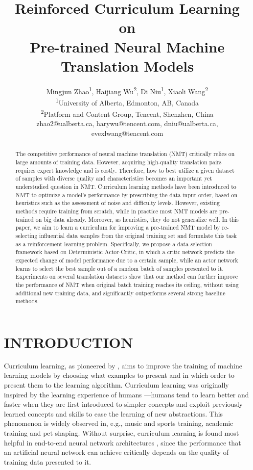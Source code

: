 \documentclass[letterpaper]{article}
\title{Reinforced Curriculum Learning on\\ Pre-trained Neural Machine Translation Models}
\author{Mingjun Zhao\textsuperscript{\rm 1}, Haijiang Wu\textsuperscript{\rm 2}, Di Niu\textsuperscript{\rm 1}, Xiaoli Wang\textsuperscript{\rm 2}\\ %
\textsuperscript{\rm 1}University of Alberta, Edmonton, AB, Canada\\
\textsuperscript{\rm 2}Platform and Content Group, Tencent, Shenzhen, China\\
zhao2@ualberta.ca, harywu@tencent.com, dniu@ualberta.ca, evexlwang@tencent.com
}%
\begin{document}
\maketitle

\begin{abstract}
The competitive performance of neural machine translation (NMT) critically relies on large amounts of training data. However, acquiring high-quality translation pairs requires expert knowledge and is costly. Therefore, how to best utilize a given dataset of samples with diverse quality and characteristics becomes an important yet understudied question in NMT. Curriculum learning methods have been introduced to NMT to optimize a model's performance by prescribing the data input order, based on heuristics such as the assessment of noise and difficulty levels. However, existing methods require training from scratch, while in practice most NMT models are pre-trained on big data already. Moreover, as heuristics, they do not generalize well. In this paper, we aim to learn a curriculum for  improving a pre-trained NMT model by re-selecting influential data samples from the original training set and formulate this task as a reinforcement learning problem. Specifically, we propose a data selection framework based on Deterministic Actor-Critic, in which a critic network predicts the expected change of model performance due to a certain sample, while an actor network learns to select the best sample out of a random batch of samples presented to it. 
Experiments on several translation datasets show that our method can further improve the performance of NMT when original batch training reaches its ceiling, without using additional new training data, and significantly outperforms several strong baseline methods.
\end{abstract}

\section{INTRODUCTION}
\label{sec:intro}


Curriculum learning, as pioneered by \cite{bengio2009curriculum}, aims to improve the training of machine learning models by choosing what examples to present and in which order to present them to the learning algorithm. Curriculum learning was originally inspired by the learning experience of humans \cite{skinner1958reinforcement} \cite{peterson2004day} \cite{krueger2009flexible}---humans tend to learn better and faster when they are first introduced to simpler concepts and exploit previously learned concepts and skills to ease the learning of new abstractions. This phenomenon is widely observed in, e.g., music and sports training, academic training and pet shaping.
Without surprise, curriculum learning is found most helpful in end-to-end neural network architectures \cite{bengio2009curriculum}, since the performance that an artificial neural network can achieve critically depends on the quality of training data presented to it.   
\end{document}
